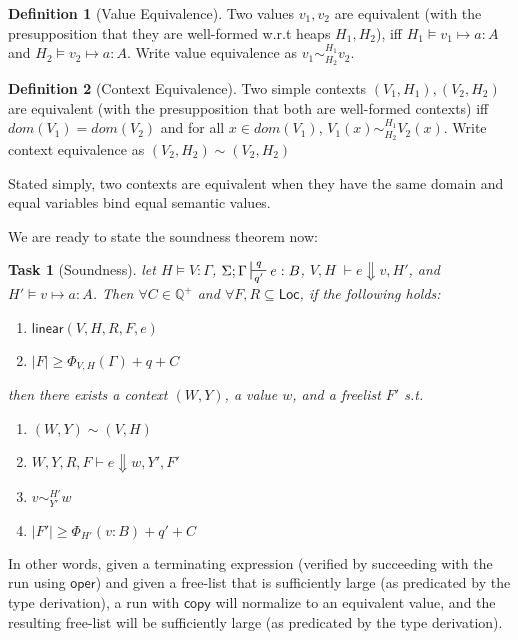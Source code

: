 \documentclass{easychair}
\newcounter{group}
\newtheorem{theorem}{Task}[group]
\newcommand{\ms}[1]{\ensuremath{\mathsf{#1}}}
\newcommand{\wfc}[5]{\mathsf{linear}(#1,#2,#3,#4,#5)}
\newcommand{\veq}[4]{#3 \sim^{#1}_{#2} #4}
\newcommand{\ctxeq}[2]{(#1) \sim (#2)}
\theoremstyle{definition}
\newtheorem{definition}{Definition}[section]
\begin{document}
\begin{definition}[Value Equivalence]
Two values $v_1,v_2$ are equivalent (with the presupposition that they are well-formed w.r.t heaps $H_1,H_2$),
iff $H_1 \vDash v_1 \mapsto a : A$ and $H_2 \vDash v_2 \mapsto a : A$. 
Write value equivalence as $\veq{H_1}{H_2}{v_1}{v_2}$.
\end{definition}

\begin{definition}[Context Equivalence]
Two simple contexts $(V_1,H_1), (V_2,H_2)$ are equivalent
(with the presupposition that both are well-formed contexts) iff $dom(V_1) = dom(V_2)$ and 
for all $x \in dom(V_1)$, $\veq{H_1}{H_2}{V_1(x)}{V_2(x)}$. Write context equivalence as 
$\ctxeq{V_2,H_2}{V_2,H_2}$
\end{definition}

Stated simply, two contexts are equivalent when they have the same domain and equal variables bind 
equal semantic values. 


We are ready to state the soundness theorem now:

\begin{theorem}[Soundness]
\label{itm:soundness} let $H \vDash V : \Gamma$, $\Sigma; \Gamma \sststile{q'}{q} e : B$,
$V,H \; \vdash e \Downarrow v, H'$, and $H' \vDash v \mapsto a : A$.
Then $\forall C \in \mathbb{Q}^{+}$ and $\forall F,R \subseteq \ms{Loc}$,
if the following holds:
\begin{enumerate} 
\item $\wfc{V}{H}{R}{F}{e}$
\item $|F| \ge \Phi_{V,H}(\Gamma) + q + C$ 
\end{enumerate}
then there exists a context $(W,Y)$, a value $w$, and a freelist $F'$ s.t.
\begin{enumerate}
	\item $\ctxeq{W,Y}{V,H}$
  \item $W,Y,R,F \vdash e \Downarrow w, Y', F'$
	\item $\veq{H'}{Y'}{v}{w}$
  \item $|F'| \ge \Phi_{H'}(v:B) + q' + C$
\end{enumerate}
\end{theorem}

In other words, given a terminating expression (verified by succeeding with the run using \ms{oper})
and given a free-list that is sufficiently large (as predicated by the type derivation), 
a run with $\ms{copy}$ will normalize to an equivalent value, and the resulting free-list 
will be sufficiently large (as predicated by the type derivation).
\end{document}
